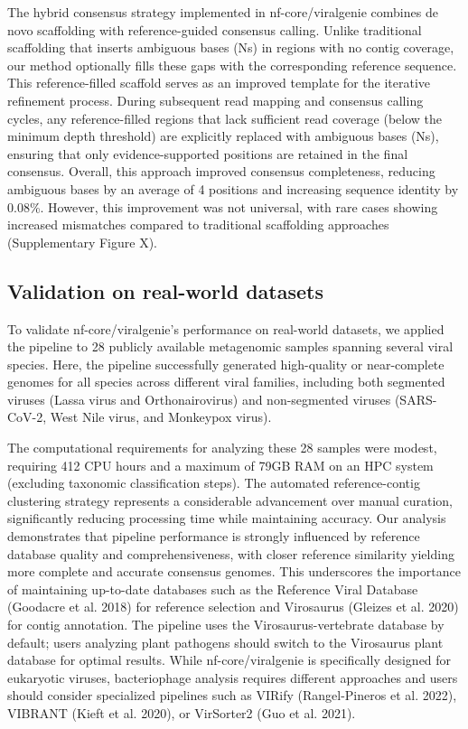 The hybrid consensus strategy implemented in nf-core/viralgenie combines de novo scaffolding with reference-guided consensus calling. Unlike traditional scaffolding that inserts ambiguous bases (Ns) in regions with no contig coverage, our method optionally fills these gaps with the corresponding reference sequence. This reference-filled scaffold serves as an improved template for the iterative refinement process. During subsequent read mapping and consensus calling cycles, any reference-filled regions that lack sufficient read coverage (below the minimum depth threshold) are explicitly replaced with ambiguous bases (Ns), ensuring that only evidence-supported positions are retained in the final consensus. Overall, this approach improved consensus completeness, reducing ambiguous bases by an average of 4 positions and increasing sequence identity by 0.08\%. However, this improvement was not universal, with rare cases showing increased mismatches compared to traditional scaffolding approaches (Supplementary Figure X).

\subsection{Validation on real-world datasets}

To validate nf-core/viralgenie's performance on real-world datasets, we applied the pipeline to 28 publicly available metagenomic samples spanning several viral species. Here, the pipeline successfully generated high-quality or near-complete genomes for all species across different viral families, including both segmented viruses (Lassa virus and Orthonairovirus) and non-segmented viruses (SARS-CoV-2, West Nile virus, and Monkeypox virus).

The computational requirements for analyzing these 28 samples were modest, requiring 412 CPU hours and a maximum of 79GB RAM on an HPC system (excluding taxonomic classification steps). The automated reference-contig clustering strategy represents a considerable advancement over manual curation, significantly reducing processing time while maintaining accuracy. Our analysis demonstrates that pipeline performance is strongly influenced by reference database quality and comprehensiveness, with closer reference similarity yielding more complete and accurate consensus genomes. This underscores the importance of maintaining up-to-date databases such as the Reference Viral Database (Goodacre et al. 2018) for reference selection and Virosaurus (Gleizes et al. 2020) for contig annotation. The pipeline uses the Virosaurus-vertebrate database by default; users analyzing plant pathogens should switch to the Virosaurus plant database for optimal results. While nf-core/viralgenie is specifically designed for eukaryotic viruses, bacteriophage analysis requires different approaches and users should consider specialized pipelines such as VIRify (Rangel-Pineros et al. 2022), VIBRANT (Kieft et al. 2020), or VirSorter2 (Guo et al. 2021).

